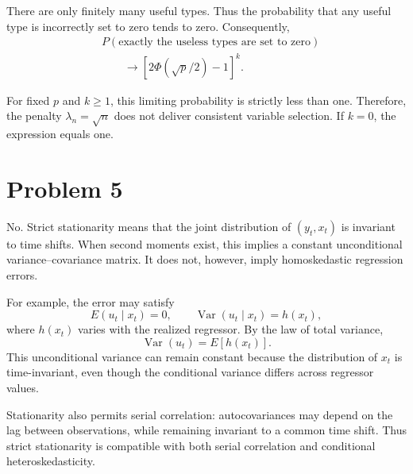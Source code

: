 \documentclass[11pt]{article}
\begin{document}
There are only finitely many useful types.
Thus the probability that any useful type
is incorrectly set to zero tends to zero.
Consequently,
\[
\boxed{
\begin{aligned}
&P(\text{exactly the useless types are set to zero})\\
&\qquad\longrightarrow
\left[2\Phi(\sqrt{p}/2)-1\right]^k.
\end{aligned}
}
\]

For fixed $p$ and $k\geq1$, this limiting
probability is strictly less than one.
Therefore, the penalty $\lambda_n=\sqrt{n}$
does not deliver consistent variable selection.
If $k=0$, the expression equals one.
\section*{Problem 5}

No. Strict stationarity means that the joint
distribution of $(y_t,x_t)$ is invariant to
time shifts. When second moments exist, this
implies a constant unconditional
variance--covariance matrix. It does not,
however, imply homoskedastic regression errors.

For example, the error may satisfy
\[
E(u_t\mid x_t)=0,
\qquad
\operatorname{Var}(u_t\mid x_t)=h(x_t),
\]
where $h(x_t)$ varies with the realized
regressor. By the law of total variance,
\[
\operatorname{Var}(u_t)=E[h(x_t)].
\]
This unconditional variance can remain
constant because the distribution of $x_t$
is time-invariant, even though the conditional
variance differs across regressor values.

Stationarity also permits serial correlation:
autocovariances may depend on the lag between
observations, while remaining invariant to
a common time shift. Thus strict stationarity
is compatible with both serial correlation
and conditional heteroskedasticity.
\end{document}
